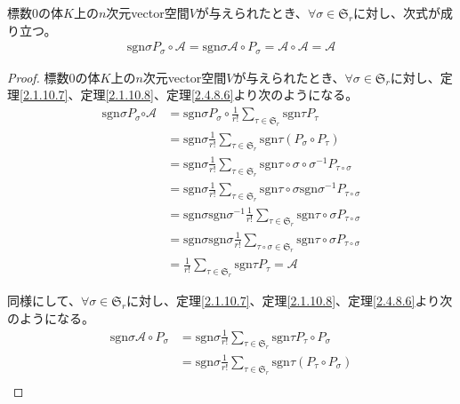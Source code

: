 \documentclass[dvipdfmx]{jsarticle}
\begin{document}
\begin{thm}\label{2.4.8.10}
標数$0$の体$K$上の$n$次元vector空間$V$が与えられたとき、$\forall\sigma \in \mathfrak{S}_{r}$に対し、次式が成り立つ。
\begin{align*}
\mathrm{sgn}\sigma P_{\sigma}\circ \mathcal{A}=\mathrm{sgn}\sigma\mathcal{A}\circ P_{\sigma}=\mathcal{A} \circ \mathcal{A} = \mathcal{A}
\end{align*}
\end{thm}
\begin{proof}
標数$0$の体$K$上の$n$次元vector空間$V$が与えられたとき、$\forall\sigma \in \mathfrak{S}_{r}$に対し、定理\ref{2.1.10.7}、定理\ref{2.1.10.8}、定理\ref{2.4.8.6}より次のようになる。
\begin{align*}
\mathrm{sgn}\sigma P_{\sigma}\mathcal{\circ A} &= \mathrm{sgn}\sigma P_{\sigma} \circ \frac{1}{r!}\sum_{\tau \in \mathfrak{S}_{r}} {\mathrm{sgn}\tau P_{\tau}}\\
&= \mathrm{sgn}\sigma\frac{1}{r!}\sum_{\tau \in \mathfrak{S}_{r}} {\mathrm{sgn}\tau\left( P_{\sigma} \circ P_{\tau} \right)}\\
&= \mathrm{sgn}\sigma\frac{1}{r!}\sum_{\tau \in \mathfrak{S}_{r}} {\mathrm{sgn}{\tau \circ \sigma \circ \sigma^{- 1}}P_{\tau \circ \sigma}}\\
&= \mathrm{sgn}\sigma\frac{1}{r!}\sum_{\tau \in \mathfrak{S}_{r}} {\mathrm{sgn}{\tau \circ \sigma}\mathrm{sgn}\sigma^{- 1}P_{\tau \circ \sigma}}\\
&= \mathrm{sgn}\sigma\mathrm{sgn}\sigma^{- 1}\frac{1}{r!}\sum_{\tau \in \mathfrak{S}_{r}} {\mathrm{sgn}{\tau \circ \sigma}P_{\tau \circ \sigma}}\\
&= \mathrm{sgn}\sigma\mathrm{sgn}\sigma\frac{1}{r!}\sum_{\tau \circ \sigma \in \mathfrak{S}_{r}} {\mathrm{sgn}{\tau \circ \sigma}P_{\tau \circ \sigma}}\\
&= \frac{1}{r!}\sum_{\tau \in \mathfrak{S}_{r}} {\mathrm{sgn}\tau P_{\tau}}=\mathcal{A}
\end{align*}\par
同様にして、$\forall\sigma \in \mathfrak{S}_{r}$に対し、定理\ref{2.1.10.7}、定理\ref{2.1.10.8}、定理\ref{2.4.8.6}より次のようになる。
\begin{align*}
\mathrm{sgn}\sigma\mathcal{A} \circ P_{\sigma} &= \mathrm{sgn}\sigma\frac{1}{r!}\sum_{\tau \in \mathfrak{S}_{r}} {\mathrm{sgn}\tau P_{\tau}} \circ P_{\sigma}\\
&= \mathrm{sgn}\sigma\frac{1}{r!}\sum_{\tau \in \mathfrak{S}_{r}} {\mathrm{sgn}\tau\left( P_{\tau} \circ P_{\sigma} \right)}\\

\end{align*}
\end{proof}
\end{document}
